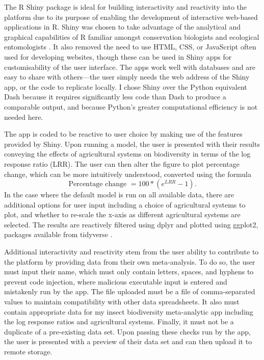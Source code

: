 \documentclass[11pt]{article}
\begin{document}
		\noindent The R Shiny package \citep{chang2022shiny} is ideal for building interactivity and reactivity into the platform due to its purpose of enabling the development of interactive web-based applications in R. Shiny was chosen to take advantage of the analytical and graphical capabilities of R familiar amongst conservation biologists and ecological entomologists \citep{lai2019evaluating}. It also removed the need to use HTML, CSS, or JavaScript often used for developing websites, though these can be used in Shiny apps for customisability of the user interface. The apps work well with databases and are easy to share with others—the user simply needs the web address of the Shiny app, or the code to replicate locally. I chose Shiny over the Python equivalent Dash \citep{hossain2019visualization} because it requires significantly less code than Dash to produce a comparable output, and because Python’s greater computational efficiency is not needed here. 
		
		\noindent The app is coded to be reactive to user choice by making use of the features provided by Shiny. Upon running a model, the user is presented with their results conveying the effects of agricultural systems on biodiversity in terms of the log response ratio (LRR). The user can then alter the figure to plot percentage change, which can be more intuitively understood, converted using the formula
		\begin{equation}
		\mbox{Percentage change } = 100 * (e^{LRR} - 1). %
		\end{equation}
		\noindent In the case where the default model is run on all available data, there are additional options for user input including a choice of agricultural systems to plot, and whether to re-scale the x-axis as different agricultural systems are selected. The results are reactively filtered using dplyr and plotted using ggplot2, packages available from tidyverse \citep{wickham2019welcome}. 
		
		\noindent Additional interactivity and reactivity stem from the user ability to contribute to the platform by providing data from their own meta-analysis. To do so, the user must input their name, which must only contain letters, spaces, and hyphens to prevent code injection, where malicious executable input is entered and mistakenly run by the app. The file uploaded must be a file of comma-separated values to maintain compatibility with other data spreadsheets. It also must contain appropriate data for my insect biodiversity meta-analytic app including the log response ratios and agricultural systems. Finally, it must not be a duplicate of a pre-existing data set. Upon passing these checks run by the app, the user is presented with a preview of their data set and can then upload it to remote storage. 
		
\end{document}
